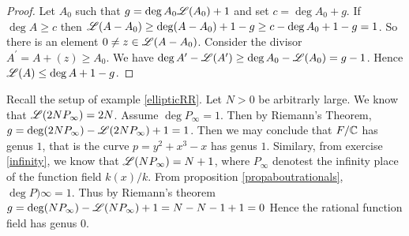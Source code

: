 \begin{proof}
	Let $A_0$ such that $g =	 \deg A_0 \mathscr{L} (A_0) + 1$ and 
	set $c = \deg A_0 + g$. If $\deg A \geq c$ then 
	$\mathscr{L} (A-A_0 ) \geq \deg (A-A_0) + 1  - g \geq c - \deg A_0 + 1 - g = 1$.
	So there is an element $0 \neq z \in \mathscr{L}(A - A_0)$. 
	Consider the divisor $A^{\prime} =  A + (z) \geq A_0$. 
	We have
	$\deg A^{\prime } - \mathscr{L} (A^{\prime}) \geq \deg A_0 - \mathscr{L} (A_0) = g -1$.
	Hence $ \mathscr{L} (A) \leq \deg A + 1 - g$.
\end{proof}


\begin{example}
	Recall the setup of example \ref{ellipticRR}. Let $N > 0$ be 
	arbitrarly large. We know that 
	$\mathscr{L} (2NP_\infty) = 2N$. Assume $\deg P_\infty = 1$.
	Then by Riemann's Theorem, $g =\deg(2NP_\infty)  - \mathscr{L} (2NP_\infty) + 1 = 1$. 
	Then we may conclude that $F/\mathbb{C}$ has genus $1$, 
	that is the curve $p = y^2 + x^3 - x$ has genus $1$. Similary, 
	from exercise \ref{infinity}, we know that $\mathscr{L} (NP_\infty) = N + 1$, 
	where $P_\infty$ denotest the infinity place of the function field $k(x)/k$.
	From proposition \ref{propaboutrationals}, $\deg P)\infty = 1$. Thus by 
	Riemann's theorem $g = \deg(NP_\infty ) - \mathscr{L} (NP_\infty) + 1 =N - N-1  + 1= 0$
	Hence the rational function field has genus $0$.
\end{example}


